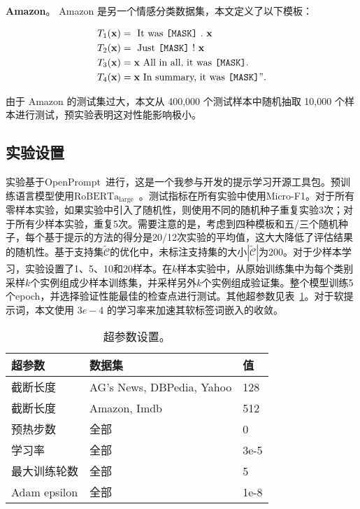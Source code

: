 \textbf{Amazon}。 Amazon 是另一个情感分类数据集，本文定义了以下模板：

{\centering
\begin{mybox}
\begin{align*}
       T_1(\mathbf{x}) & = \text{ It was \texttt{[MASK]} } .\  \mathbf{x}\\
    T_2(\mathbf{x}) &  = \text{ Just \texttt{[MASK]} ! } \mathbf{x}\\
      T_3(\mathbf{x}) & = \mathbf{x} \text{ All in all, it was  \texttt{[MASK]}} . \\
      T_4(\mathbf{x}) & = \mathbf{x} \text{ In summary, it was  \texttt{[MASK]}} ".  
\end{align*}
\end{mybox}
}

由于 Amazon 的测试集过大，本文从 400,000 个测试样本中随机抽取 10,000 个样本进行测试，预实验表明这对性能影响极小。



\subsection{实验设置}
实验基于OpenPrompt~\cite{ding2021openprompt}进行，这是一个我参与开发的提示学习开源工具包。预训练语言模型使用$\text{RoBERTa}_\text{large}$~\cite{liu2019roberta}。测试指标在所有实验中使用Micro-F1。对于所有零样本实验，如果实验中引入了随机性，则使用不同的随机种子重复实验3次；对于所有少样本实验，重复5次。需要注意的是，考虑到四种模板和五/三个随机种子，每个基于提示的方法的得分是20/12次实验的平均值，这大大降低了评估结果的随机性。基于支持集$\tilde{\mathcal{C}}$的优化中，未标注支持集的大小$|\tilde{\mathcal{C}}|$为200。对于少样本学习，实验设置了1、5、10和20样本。在$k$样本实验中，从原始训练集中为每个类别采样$k$个实例组成少样本训练集，并采样另外$k$个实例组成验证集。整个模型训练5个epoch，并选择验证性能最佳的检查点进行测试。其他超参数见表~\ref{tab:app_exp_settings}。对于软提示词，本文使用 $3e-4$ 的学习率来加速其软标签词嵌入的收敛。

\begin{table}[!htbp]
    \centering
    \begin{tabular}{p{}p{}p{}}
\toprule
      超参数  & 数据集 & 值 \\
\midrule
   截断长度  & AG's News, DBPedia, Yahoo    &  128 \\
截断长度  & Amazon, Imdb    &  512 \\
   预热步数 & 全部 & 0 \\
   学习率 & 全部 & 3e-5 \\
   最大训练轮数 & 全部 & 5\\
   Adam epsilon & 全部 & 1e-8 \\
\bottomrule
    \end{tabular}
    \caption{超参数设置。}
    \label{tab:app_exp_settings}
\end{table}




